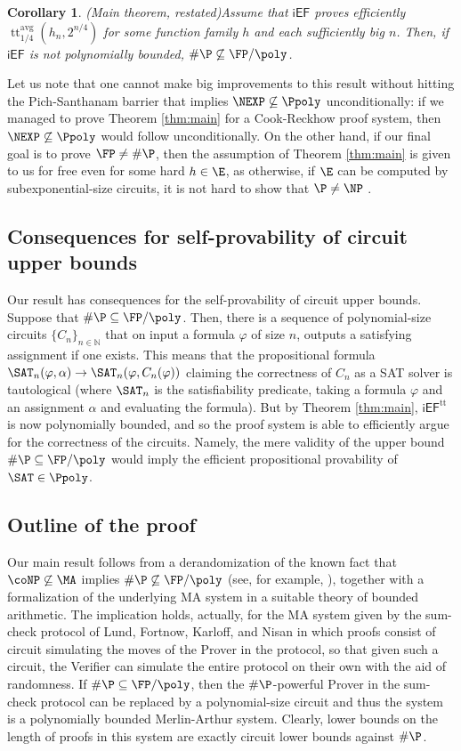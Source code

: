 \documentclass[11pt]{article}
\newcommand{\iEF}{\mathsf{iEF}}
\theoremstyle{definition}
\theoremstyle{plain}
\newtheorem{corollary}[definition]{Corollary}
\theoremstyle{remark}
\DeclareMathOperator*{\ttt}{tt}
\newcommand{\ttable}{\ttt^{\operatorname{avg}}}
\newcommand{\bbN}{\mathbb{N}}
\begin{document}
\begin{corollary}(Main theorem, restated)\label{cor:main} Assume that $\iEF$ proves efficiently $\ttable_{1/4}(h_n,2^{n/4})$ for some function family $h$ and each sufficiently big $n$. Then, if $\iEF$ is not polynomially bounded, $\#\P \not\subseteq\FP/\poly$.
\end{corollary}

Let us note that one cannot make big improvements to this result without hitting the Pich-Santhanam barrier that implies $\NEXP \not\subseteq \Ppoly$ unconditionally: if we managed to prove Theorem \ref{thm:main} for a Cook-Reckhow proof system, then $\NEXP\not\subseteq\Ppoly$ would follow unconditionally. On the other hand, if our final goal is to prove $\FP\neq\#\P$, then the assumption of Theorem \ref{thm:main} is given to us for free even for some hard $h\in \E$, as otherwise, if $\E$ can be computed by subexponential-size circuits, it is not hard to show that $\P \neq \NP$ \cite{Kra04-Diag}. 

\subsection*{Consequences for self-provability of circuit upper bounds} Our result has consequences for the self-provability of circuit upper bounds. Suppose that $ \#\P\subseteq\FP/\poly$. Then, there is a sequence of polynomial-size circuits $\{C_n\}_{n\in\bbN}$ that on input a formula $\varphi$ of size $n$, outputs a satisfying assignment if one exists. This means that the propositional formula $\SAT_n(\varphi, \alpha)\rightarrow \SAT_n(\varphi,C_n(\varphi))$ claiming the correctness of $C_n$ as a SAT solver is tautological (where $\SAT_n$ is the satisfiability predicate, taking a formula $\varphi$ and an assignment $\alpha$ and evaluating the formula). But by Theorem \ref{thm:main}, $\iEF^{\operatorname{tt}}$ is now polynomially bounded, and so the proof system is able to efficiently argue for the correctness of the circuits. Namely, the mere validity of the upper bound $\#\P\subseteq\FP/\poly$ would imply the efficient propositional provability of $\SAT\in\Ppoly$.

\subsection*{Outline of the proof}
Our main result follows from a derandomization of the known fact that $\coNP \not\subseteq\MA$ implies $\#\P\not\subseteq\FP/\poly$ (see, for example, \cite[Thm. 8.22]{AB09}), together with a formalization of the underlying MA system in a suitable theory of bounded arithmetic. The implication holds, actually, for the MA system given by the sum-check protocol of Lund, Fortnow, Karloff, and Nisan \cite{LFKN92-SumCheck} in which proofs consist of circuit simulating the moves of the Prover in the protocol, so that given such a circuit, the Verifier can simulate the entire protocol on their own with the aid of randomness. If $\#\P\subseteq\FP/\poly$, then the $\#\P$-powerful Prover in the sum-check protocol can be replaced by a polynomial-size circuit and thus the system is a polynomially bounded Merlin-Arthur system. Clearly, lower bounds on the length of proofs in this system are exactly circuit lower bounds against $\#\P$.
\end{document}

